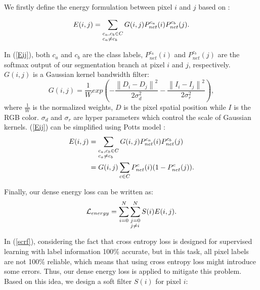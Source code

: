 \documentclass[letterpaper]{article} \usepackage{aaai20}  \usepackage{times}  \usepackage{helvet} \usepackage{courier}  \usepackage[hyphens]{url}  \usepackage{graphicx} \urlstyle{rm} \def\UrlFont{\rm}  \usepackage{graphicx}  \frenchspacing  \setlength{\pdfpagewidth}{8.5in}  \setlength{\pdfpageheight}{11in}
\begin{document}
We firstly define the energy formulation between pixel $i$ and $j$ based on \cite{joy2019efficient}:

\begin{equation}
E(i,j)=\sum_{\begin{subarray}{l}
	c_a,c_b\in C \\c_a \neq c_b
	\end{subarray}}
G(i,j)P_{net}^{c_a}(i)P_{net}^{c_b}(j).\label{Eij}
\end{equation}

In (\ref{Eij}), both $c_a$ and $c_b$ are the class labels, $P_{net}^{c_a}(i)$ and $P_{net}^{c_b}(j)$ are the softmax output of our segmentation branch at pixel $i$ and $j$, respectively. $G(i,j)$ is a Gaussian kernel bandwidth filter:
\begin{equation}
G(i,j)=\frac{1}{W}exp(-\frac{\left \| D_i-D_j \right \|^2}{2\sigma _{d}^{2}}-\frac{\left \| I_i-I_j \right \|^2}{2\sigma _{r}^{2}}),\label{Gij}
\end{equation}
where $\frac{1}{W}$ is the normalized weights,  $D$ is the pixel spatial position while $I$ is the RGB color. $\sigma_{d}$ and $\sigma_{r}$ are hyper parameters which control the scale of Gaussian kernels. (\ref{Eij}) can be simplified using Potts model \cite{tang2018regularized}:
\begin{equation}
\begin{aligned}
E(i,j)&=\sum_{\begin{subarray}{l}
	c_a,c_b\in C \\c_a \neq c_b
	\end{subarray}}
G(i,j)P_{net}^{c_a}(i)P_{net}^{c_b}(j) \\
&= G(i,j)\sum_{c\in C}P_{net}^{c}(i)(1-P_{net}^{c}(j)).\label{potts}
\end{aligned}
\end{equation}

Finally, our dense energy loss can be written as:
\begin{equation}
\mathcal{L}_{energy} = \sum_{i=0}^{N}\sum_{\begin{subarray}{l}
	j=0 \\j \neq i
	\end{subarray}}^{N}S(i)E(i,j). \label{scrf}
\end{equation}

In (\ref{scrf}), considering the fact that cross entropy loss is designed for supervised learning with label information 100\% accurate, but in this task, all pixel labels are not 100\% reliable, which means that using cross entropy loss might introduce some errors. Thus, our dense energy loss is applied to mitigate this problem. Based on this idea, we design a soft filter $S(i)$ for pixel $i$:
\end{document}
